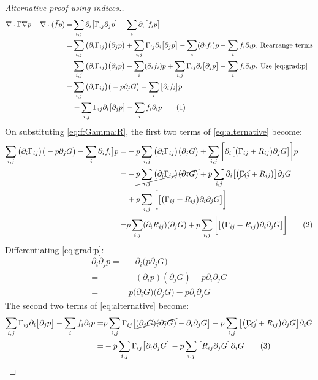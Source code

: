 \documentclass[]{article}
\newcommand\numberthis{\addtocounter{equation}{1}\tag{\theequation}}
\begin{document}
\begin{proof}[Alternative proof using indices.]
	\begin{align*}
		\nabla\cdot\Gamma\nabla p - \nabla \cdot (\vec{f} p) =& \sum_{i,j}\partial_i\big[\Gamma_{ij}\partial_j p\big] - \sum_{i} \partial_i \big[f_i p\big]\\
		=&\sum_{i,j}\big(\partial_i\Gamma_{ij}\big)\big(\partial_j p\big) + \sum_{i,j}\Gamma_{ij}\partial_i\big[\partial_j p\big]-\sum_{i} (\partial_i f_i)  p-  \sum_{i} f_i\partial_i  p  \text{. Rearrange terms}\\
		=&\sum_{i,j}\big(\partial_i\Gamma_{ij}\big)\big(\partial_j p\big) -\sum_{i} (\partial_i f_i)  p + \sum_{i,j}\Gamma_{ij}\partial_i\big[\partial_j p\big]-  \sum_{i} f_i\partial_i  p \text{. Use \eqref{eq:grad:p}}\\
		=&\sum_{i,j}\big(\partial_i\Gamma_{ij}\big)\big(-p \partial_j G\big) -\sum_{i} \big[\partial_i f_i\big]  p \\
		&+ \sum_{i,j}\Gamma_{ij}\partial_i\big[\partial_j p\big]-  \sum_{i} f_i\partial_i  p  \numberthis \label{eq:alternative}
	\end{align*} 
	On substituting \eqref{eq:f:Gamma:R}, the first two terms of \eqref{eq:alternative} become:
	\begin{align*}
		\sum_{i,j}\big(\partial_i\Gamma_{ij}\big)\big(-p \partial_j G\big) -\sum_{i} \partial_i f_i\big]  p=&-p \sum_{i,j} \big(\partial_i\Gamma_{ij}\big)\big(\partial_j G\big) +\sum_{i,j} \bigg[\partial_i \big[ \big(\Gamma_{ij} +R_{ij}\big)\partial_j G \big] \bigg]  p\\
		=&-\cancel{p \sum_{i,j} \big(\partial_i\Gamma_{ij}\big)\big(\partial_j G\big)} + p \sum_{i,j} \partial_i \big[ \big(\cancel{\Gamma_{ij}} +R_{ij}\big) \big]\partial_j G  \\&
		+p \sum_{i,j} \bigg[ \big[ \big(\Gamma_{ij} +R_{ij}\big)\partial_i \partial_j G \big] \bigg]  \\
		=&p\sum_{i,j} (\partial_i R_{ij})  (\partial_j G)  +p\sum_{i,j} \bigg[ \big[ \big(\Gamma_{ij} +R_{ij}\big)\partial_i \partial_j G \big] \bigg]   \numberthis \label{eg:altern:12}
	\end{align*}
	Differentiating \eqref{eq:grad:p}:
	\begin{align*}
		\partial_i \partial_j p =& - \partial_i \big(p \partial_j G\big)\\
		=& -(\partial_i p) (\partial_j G) - p \partial_i \partial_j G\\
		=&p \big(\partial_i G\big) \big(\partial_j G\big)  - p \partial_i \partial_j G
	\end{align*}
	The second two terms of \eqref{eq:alternative} become:
	\begin{align*}
		\sum_{i,j}\Gamma_{ij}\partial_i\big[\partial_j p\big]-  \sum_{i} f_i\partial_i  p =& p\sum_{i,j}\Gamma_{ij}\big[ \cancel{(\partial_j G)(\partial_j G)} -  \partial_i \partial_j G\big] -  p \sum_{i,j} \big[\big(\cancel{\Gamma_{ij}} + R_{ij}\big)\partial_j G\big] \partial_i  G \\
		 =&   - p\sum_{i,j}\Gamma_{ij}\big[ \partial_i \partial_j G\big] -  p \sum_{i,j} \big[ R_{ij}\partial_j G\big] \partial_i  G\numberthis
		 \label{eq:altern:34}
	\end{align*}
\end{proof}
\end{document}

